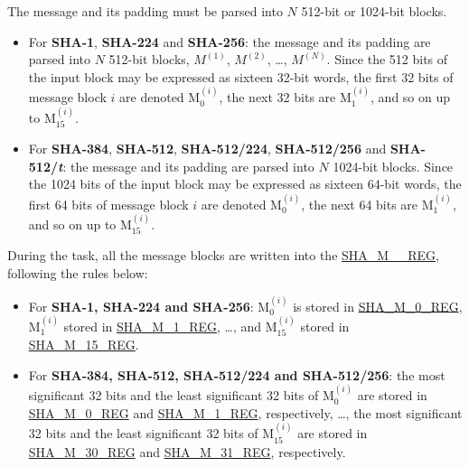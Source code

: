 \documentclass[main\_\_EN.tex]{subfiles}
\begin{document}
The message and its padding must be parsed into \begin{math}N\end{math} 512-bit or 1024-bit blocks.

\begin{itemize}
    \item For \textbf{SHA-1}, \textbf{SHA-224} and \textbf{SHA-256}: the message and its padding are parsed into \begin{math}N\end{math} 512-bit blocks, \begin{math}M^{(1)}\end{math}, \begin{math}M^{(2)}\end{math}, \dots, \begin{math}M^{(N)}\end{math}. Since the 512 bits of the input block may be expressed as sixteen 32-bit words, the first 32 bits of message block \begin{math}i\end{math} are denoted M$^{(i)}_{0}$, the next 32 bits are M$^{(i)}_{1}$, and so on up to M$^{(i)}_{15}$.
    \item For \textbf{SHA-384}, \textbf{SHA-512}, \textbf{SHA-512/224}, \textbf{SHA-512/256} and \textbf{SHA-512/{\it{t}}}: the message and its padding are parsed into \begin{math}N\end{math} 1024-bit blocks. Since the 1024 bits of the input block may be expressed as sixteen 64-bit words, the first 64 bits of message block \begin{math}i\end{math} are denoted M$^{(i)}_{0}$, the next 64 bits are M$^{(i)}_{1}$, and so on up to M$^{(i)}_{15}$.
\end{itemize}

During the task, all the message blocks are written into the \hyperref[regdesc:SHAMNREG]{SHA\_M\_\_REG}, following the rules below:
\begin{itemize}
    \item For \textbf{SHA-1, SHA-224 and SHA-256}: M$^{(i)}_{0}$ is stored in \hyperref[regdesc:SHAMNREG]{SHA\_M\_0\_REG}, M$^{(i)}_1$ stored in \hyperref[regdesc:SHAMNREG]{SHA\_M\_1\_REG}, \dots, and M$^{(i)}_{15}$ stored in \hyperref[regdesc:SHAMNREG]{SHA\_M\_15\_REG}.
    \item For \textbf{SHA-384, SHA-512, SHA-512/224 and SHA-512/256}: the most significant 32 bits and the least significant 32 bits of M$^{(i)}_0 $ are stored in \hyperref[regdesc:SHAMNREG]{SHA\_M\_0\_REG} and \hyperref[regdesc:SHAMNREG]{SHA\_M\_1\_REG}, respectively, \dots, the most significant 32 bits and the least significant 32 bits of M$^{(i)}_{15}$ are stored in \hyperref[regdesc:SHAMNREG]{SHA\_M\_30\_REG} and \hyperref[regdesc:SHAMNREG]{SHA\_M\_31\_REG}, respectively.

\end{itemize}
\end{document}
